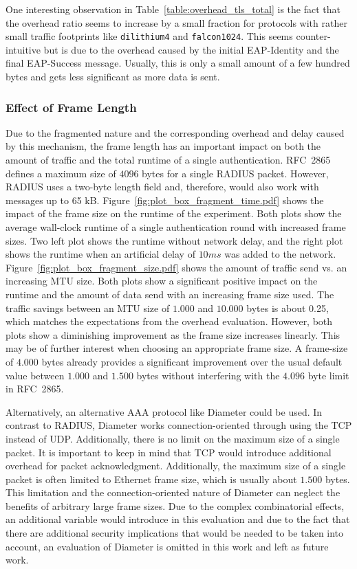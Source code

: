 One interesting observation in Table~\ref{table:overhead_tls_total} is the fact that the overhead ratio seems to increase by a small fraction for protocols with rather small traffic footprints like \texttt{dilithium4} and \texttt{falcon1024}. This seems counter-intuitive but is due to the overhead caused by the initial EAP-Identity and the final EAP-Success message. Usually, this is only a small amount of a few hundred bytes and gets less significant as more data is sent.

\subsubsection{Effect of Frame Length}
Due to the fragmented nature and the corresponding overhead and delay caused by this mechanism, the frame length has an important impact on both the amount of traffic and the total runtime of a single authentication. RFC~2865 defines a maximum size of \(4096\) bytes for a single RADIUS packet\cite{rfc2865}. However, RADIUS uses a two-byte length field and, therefore, would also work with messages up to 65 kB. Figure~\ref{fig:plot_box_fragment_time.pdf} shows the impact of the frame size on the runtime of the experiment. Both plots show the average wall-clock runtime of a single authentication round with increased frame sizes. Two left plot shows the runtime without network delay, and the right plot shows the runtime when an artificial delay of \(10ms\) was added to the network. Figure~\ref{fig:plot_box_fragment_size.pdf} shows the amount of traffic send vs. an increasing MTU size. Both plots show a significant positive impact on the runtime and the amount of data send with an increasing frame size used. The traffic savings between an MTU size of \(1.000\) and \(10.000\) bytes is about 0.25, which matches the expectations from the overhead evaluation. However, both plots show a diminishing improvement as the frame size increases linearly. This may be of further interest when choosing an appropriate frame size. A frame-size of \(4.000\) bytes already provides a significant improvement over the usual default value between \(1.000\) and \(1.500\) bytes without interfering with the \(4.096\) byte limit in RFC~2865.

Alternatively, an alternative \ac{AAA} protocol like Diameter could be used. In contrast to RADIUS, Diameter works connection-oriented through using the TCP instead of UDP. Additionally, there is no limit on the maximum size of a single packet. It is important to keep in mind that TCP would introduce additional overhead for packet acknowledgment. Additionally, the maximum size of a single packet is often limited to Ethernet frame size, which is usually about \(1.500\) bytes. This limitation and the connection-oriented nature of Diameter can neglect the benefits of arbitrary large frame sizes. Due to the complex combinatorial effects, an additional variable would introduce in this evaluation and due to the fact that there are additional security implications that would be needed to be taken into account, an evaluation of Diameter is omitted in this work and left as future work.  

